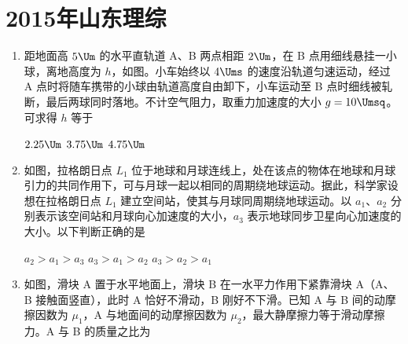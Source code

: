 \documentclass[\gkver]{gaokaozhenti}
\begin{document}
\chapter{2015年山东理综}

\begin{enumerate}
\item
距地面高 $5\Um$ 的水平直轨道 A、B 两点相距 $2\Um$，在 B 点用细线悬挂一小球，离地高度为 $h$，如图。小车始终以 $4\Ums$ 的速度沿轨道匀速运动，经过 A 点时将随车携带的小球由轨道高度自由卸下，小车运动至 B 点时细线被轧断，最后两球同时落地。不计空气阻力，取重力加速度的大小 $g=10\Umsq$。可求得 $h$ 等于


\fourchoices[answer=A]
{$1.25\Um$}
{$2.25\Um$}
{$3.75\Um$}
{$4.75\Um$}


\item
如图，拉格朗日点 $L_{1}$ 位于地球和月球连线上，处在该点的物体在地球和月球引力的共同作用下，可与月球一起以相同的周期绕地球运动。据此，科学家设想在拉格朗日点 $L_{1}$ 建立空间站，使其与月球同周期绕地球运动。以 $a_{1}$、$a_{2}$ 分别表示该空间站和月球向心加速度的大小，$a_{3}$ 表示地球同步卫星向心加速度的大小。以下判断正确的是


{$a_{2}>a_{1}>a_{3}$}
{$a_{3}>a_{1}>a_{2}$}
{$a_{3}>a_{2}>a_{1}$}


\item
如图，滑块 A 置于水平地面上，滑块 B 在一水平力作用下紧靠滑块 A（A、B 接触面竖直），此时 A 恰好不滑动，B 刚好不下滑。已知 A 与 B 间的动摩擦因数为 $\mu_{1}$，A 与地面间的动摩擦因数为 $\mu_{2}$，最大静摩擦力等于滑动摩擦力。A 与 B 的质量之比为


\end{enumerate}
\end{document}
